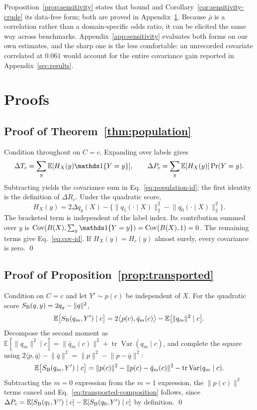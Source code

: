 Proposition~\ref{prop:sensitivity} states that bound and Corollary~\ref{cor:sensitivity-crude}
its data-free form; both are proved in Appendix~\ref{app:proofs}. Because $\bar\rho$ is a
correlation rather than a domain-specific odds ratio, it can be elicited the same way across
benchmarks. Appendix~\ref{app:sensitivity} evaluates both forms on our own estimates, and
the sharp one is the less comfortable: an unrecorded covariate correlated at $0.061$ would
account for the entire covariance gain reported in Appendix~\ref{sec:results}.



\section{Proofs}\label{app:proofs}

\subsection{Proof of Theorem~\ref{thm:population}}
Condition throughout on $C=c$. Expanding over labels gives
\[
\Delta T_c=\sum_y\mathbb E[H_X(y)\ind \{Y=y\}],\qquad
\Delta P_c=\sum_y\mathbb E[H_X(y)]\Pr(Y=y).
\]
Subtracting yields the covariance sum in Eq.~\eqref{eq:population-id}; the first
identity is the definition of $\Delta R_c$. Under the quadratic score,
\[
H_X(y)=2\Delta q_y(X)-\{\lVert q_1(\cdot\mid X)\rVert_2^2-
\lVert q_0(\cdot\mid X)\rVert_2^2\}.
\]
The bracketed term is independent of the label index. Its contribution summed over $y$
is $\operatorname{Cov}(B(X),\sum_y\ind \{Y=y\})=
\operatorname{Cov}(B(X),1)=0$. The remaining terms give Eq.~\eqref{eq:cov-id}. If
$H_X(y)=H_c(y)$ almost surely, every covariance is zero. \qed

\subsection{Proof of Proposition~\ref{prop:transported}}
Condition on $C=c$ and let $Y'\sim p(c)$ be independent of $X$. For the quadratic score
$S_{\rm B}(q,y)=2q_y-\lVert q\rVert^2$,
\begin{equation}
\mathbb E\bigl[S_{\rm B}(q_m,Y')\mid c\bigr]
=2\bigl\langle p(c),\bar q_m(c)\bigr\rangle-\mathbb E\bigl[\lVert q_m\rVert^2\mid c\bigr].
\end{equation}
Decompose the second moment as
$\mathbb E[\lVert q_m\rVert^2\mid c]=\lVert\bar q_m(c)\rVert^2
+\operatorname{tr}\operatorname{Var}(q_m\mid c)$, and complete the square using
$2\langle p,\bar q\rangle-\lVert\bar q\rVert^2=\lVert p\rVert^2-\lVert p-\bar q\rVert^2$:
\begin{equation}
\mathbb E\bigl[S_{\rm B}(q_m,Y')\mid c\bigr]
=\lVert p(c)\rVert^2-\lVert p(c)-\bar q_m(c)\rVert^2
-\operatorname{tr}\operatorname{Var}(q_m\mid c).
\end{equation}
Subtracting the $m=0$ expression from the $m=1$ expression, the $\lVert p(c)\rVert^2$
terms cancel and Eq.~\eqref{eq:transported-composition} follows, since
$\Delta P_c=\mathbb E[S_{\rm B}(q_1,Y')\mid c]-\mathbb E[S_{\rm B}(q_0,Y')\mid c]$ by
definition. \qed


